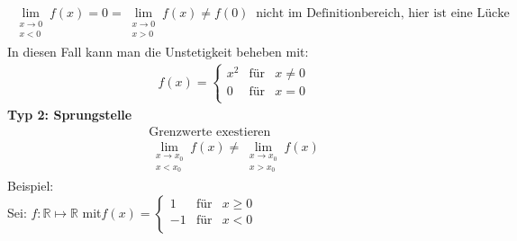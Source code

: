 \begin{align*}
\lim\limits_ {\substack{x \to 0\\x<0}}f(x)=0=\lim\limits_ {\substack{x \to 0\\x>0}}f(x)\neq f(0) \;\;\text{nicht im Definitionbereich, hier ist eine Lücke }
\end{align*}
In diesen Fall kann man die Unstetigkeit beheben mit:\\
\begin{align*}
f(x) =     \left\{ \begin{array}{rcl}
x^2& \mbox{für} & x\neq0\\
0 & \mbox{für} & x= 0 \\
\end{array}\right.
\end{align*}
\textbf{Typ 2: Sprungstelle}\\
\begin{align*}
\text{Grenzwerte exestieren }\\
\boxed{\lim\limits_ {\substack{x\to x_0\\x<x_0}}f(x)\neq\lim\limits_ {\substack{x\to x_0\\x>x_0}}f(x)}
\end{align*}
Beispiel:\\
Sei: $ f:\mathbb{R}\longmapsto\mathbb{R} $ mit$ f(x) =     \left\{ \begin{array}{rcl}
1 & \mbox{für} & x\geq0\\
-1 & \mbox{für} & x< 0 \\

\end{array}\right.$\\
